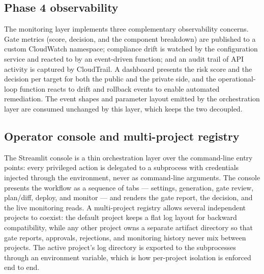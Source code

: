 \subsection{Phase 4 observability}
\label{subsec:impl-monitor}

The monitoring layer implements three complementary observability concerns. Gate metrics
(score, decision, and the component breakdown) are published to a custom CloudWatch
namespace; compliance drift is watched by the configuration service and reacted to by an
event-driven function; and an audit trail of API activity is captured by CloudTrail. A
dashboard presents the risk score and the decision per target for both the public and the
private side, and the operational-loop function reacts to drift and rollback events to
enable automated remediation. The event shapes and parameter layout emitted by the
orchestration layer are consumed unchanged by this layer, which keeps the two decoupled.

\subsection{Operator console and multi-project registry}
\label{subsec:impl-ui}

The Streamlit console is a thin orchestration layer over the command-line entry points:
every privileged action is delegated to a subprocess with credentials injected through
the environment, never as command-line arguments. The console presents the workflow as a
sequence of tabs --- settings, generation, gate review, plan/diff, deploy, and monitor
--- and renders the gate report, the decision, and the live monitoring reads. A
multi-project registry allows several independent projects to coexist: the default
project keeps a flat log layout for backward compatibility, while any other project owns
a separate artifact directory so that gate reports, approvals, rejections, and monitoring
history never mix between projects. The active project's log directory is exported to the
subprocesses through an environment variable, which is how per-project isolation is
enforced end to end.
